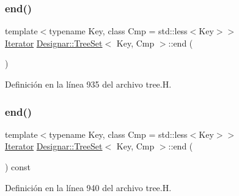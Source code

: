\subsubsection{\texorpdfstring{end()}{end()}\hspace{0.1cm}{\footnotesize\ttfamily [1/2]}}
{\footnotesize\ttfamily template$<$typename Key, class Cmp = std\+::less$<$\+Key$>$$>$ \\
\hyperlink{class_designar_1_1_tree_set_1_1_iterator}{Iterator} \hyperlink{class_designar_1_1_tree_set}{Designar\+::\+Tree\+Set}$<$ Key, Cmp $>$\+::end (\begin{DoxyParamCaption}{ }\end{DoxyParamCaption})\hspace{0.3cm}{\ttfamily [inline]}}



Definición en la línea 935 del archivo tree.\+H.

\mbox{\label{class_designar_1_1_tree_set_a199fd4c6fa4e0ad40be0477fef024d9d}} 
\subsubsection{\texorpdfstring{end()}{end()}\hspace{0.1cm}{\footnotesize\ttfamily [2/2]}}
{\footnotesize\ttfamily template$<$typename Key, class Cmp = std\+::less$<$\+Key$>$$>$ \\
\hyperlink{class_designar_1_1_tree_set_1_1_iterator}{Iterator} \hyperlink{class_designar_1_1_tree_set}{Designar\+::\+Tree\+Set}$<$ Key, Cmp $>$\+::end (\begin{DoxyParamCaption}{ }\end{DoxyParamCaption}) const\hspace{0.3cm}{\ttfamily [inline]}}



Definición en la línea 940 del archivo tree.\+H.

\mbox{\label{class_designar_1_1_tree_set_ad620aa099eb1b4d40db8470ea6c1d5bc}} 
